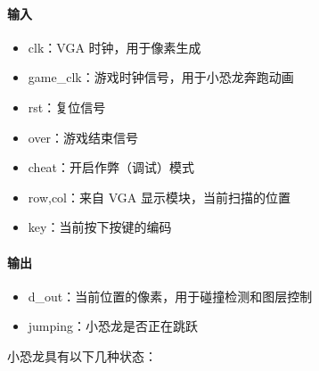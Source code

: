 \documentclass[hyperref,UTF8,12pt,a4paper]{ctexart}
\providecommand{\tightlist}{%
  \setlength{\itemsep}{0pt}\setlength{\parskip}{0pt}}
\begin{document}
\hypertarget{ux8f93ux5165-5}{%
\paragraph{输入}\label{ux8f93ux5165-5}}

\begin{itemize}
\tightlist
\item
  clk：VGA 时钟，用于像素生成
\item
  game\_clk：游戏时钟信号，用于小恐龙奔跑动画
\item
  rst：复位信号
\item
  over：游戏结束信号
\item
  cheat：开启作弊（调试）模式
\item
  row,col：来自 VGA 显示模块，当前扫描的位置
\item
  key：当前按下按键的编码
\end{itemize}

\hypertarget{ux8f93ux51fa-5}{%
\paragraph{输出}\label{ux8f93ux51fa-5}}

\begin{itemize}
\tightlist
\item
  d\_out：当前位置的像素，用于碰撞检测和图层控制
\item
  jumping：小恐龙是否正在跳跃
\end{itemize}

小恐龙具有以下几种状态：
\end{document}
